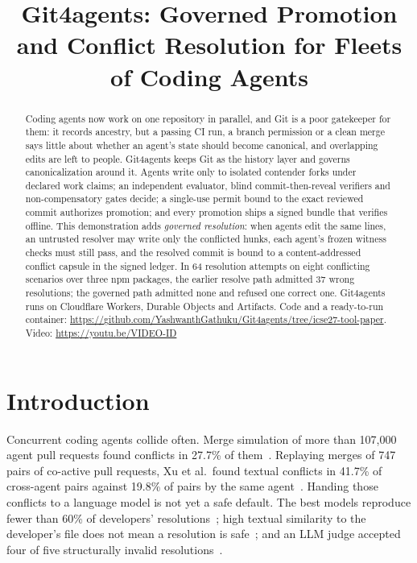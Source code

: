 \documentclass[10pt,conference]{IEEEtran}
\newcommand{\tool}{Git4agents}
\begin{document}
\title{\tool{}: Governed Promotion and Conflict Resolution for Fleets of Coding Agents}

\author{
}

\maketitle

\begin{abstract}
Coding agents now work on one repository in parallel, and Git is a poor gatekeeper for them: it records ancestry, but a passing CI run, a branch permission or a clean merge says little about whether an agent's state should become canonical, and overlapping edits are left to people. \tool{} keeps Git as the history layer and governs canonicalization around it. Agents write only to isolated contender forks under declared work claims; an independent evaluator, blind commit-then-reveal verifiers and non-compensatory gates decide; a single-use permit bound to the exact reviewed commit authorizes promotion; and every promotion ships a signed bundle that verifies offline. This demonstration adds \emph{governed resolution}: when agents edit the same lines, an untrusted resolver may write only the conflicted hunks, each agent's frozen witness checks must still pass, and the resolved commit is bound to a content-addressed conflict capsule in the signed ledger. In 64 resolution attempts on eight conflicting scenarios over three npm packages, the earlier resolve path admitted 37 wrong resolutions; the governed path admitted none and refused one correct one. \tool{} runs on Cloudflare Workers, Durable Objects and Artifacts.
Code and a ready-to-run container: \url{https://github.com/YashwanthGathuku/Git4agents/tree/icse27-tool-paper}. Video: \url{https://youtu.be/VIDEO-ID}
\end{abstract}

\section{Introduction}
Concurrent coding agents collide often. Merge simulation of more than 107,000 agent pull requests found conflicts in 27.7\% of them~\cite{ogenrwot2026agenticflict}. Replaying merges of 747 pairs of co-active pull requests, Xu et al.\ found textual conflicts in 41.7\% of cross-agent pairs against 19.8\% of pairs by the same agent~\cite{xu2026agentprs}. Handing those conflicts to a language model is not yet a safe default. The best models reproduce fewer than 60\% of developers' resolutions~\cite{schesch2026mergebench}; high textual similarity to the developer's file does not mean a resolution is safe~\cite{zhang2026swegitbench}; and an LLM judge accepted four of five structurally invalid resolutions~\cite{shen2026llmjudge}.
\end{document}
